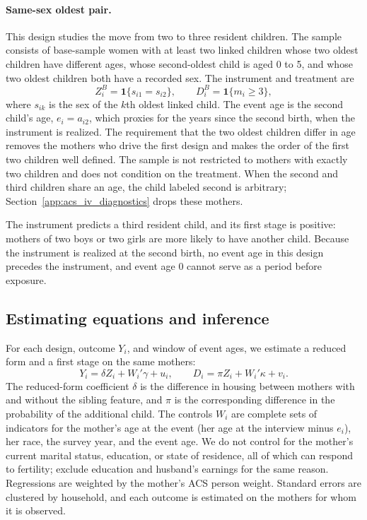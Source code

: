 \paragraph{Same-sex oldest pair.}
This design studies the move from two to three resident children. The sample
consists of base-sample women with at least two linked children whose two oldest
children have different ages, whose second-oldest child is aged 0 to 5, and whose
two oldest children both have a recorded sex. The instrument and treatment are
\begin{equation}
Z_i^{B}=\mathbf{1}\{s_{i1}=s_{i2}\},
\qquad
D_i^{B}=\mathbf{1}\{m_i\ge 3\},
\label{eq:acsiv_samesex_def}
\end{equation}
where $s_{ik}$ is the sex of the $k$th oldest linked child. The event age is the
second child's age, $e_i=a_{i2}$, which proxies for the years since the second
birth, when the instrument is realized. The requirement that the two oldest
children differ in age removes the mothers who drive the first design and makes
the order of the first two children well defined. The sample is not restricted to
mothers with exactly two children and does not condition on the treatment. When the
second and third children share an age, the child labeled second is arbitrary;
Section~\ref{app:acs_iv_diagnostics} drops these mothers.

The instrument predicts a third resident child, and its first stage is positive:
mothers of two boys or two girls are more likely to have another child. Because the
instrument is realized at the second birth, no event age in this design precedes
the instrument, and event age 0 cannot serve as a period before exposure.

\subsection{Estimating equations and inference}
\label{app:acs_iv_equations}

For each design, outcome $Y_i$, and window of event ages, we estimate a reduced form
and a first stage on the same mothers:
\begin{equation}
Y_i=\delta Z_i+W_i'\gamma+u_i,
\qquad
D_i=\pi Z_i+W_i'\kappa+v_i .
\label{eq:acsiv_rf_fs}
\end{equation}
The reduced-form coefficient $\delta$ is the difference in housing between mothers
with and without the sibling feature, and $\pi$ is the corresponding difference in
the probability of the additional child. The controls $W_i$ are complete sets of
indicators for the mother's age at the event (her age at the interview minus
$e_i$), her race, the survey year, and the event age. We do not control for the
mother's current marital status, education, or state of residence, all of which can
respond to fertility; \citet[p.~465, footnote~12]{angrist1998children} exclude
education and husband's earnings for the same reason. Regressions are weighted by
the mother's ACS person weight. Standard errors are clustered by household, and each
outcome is estimated on the mothers for whom it is observed.

